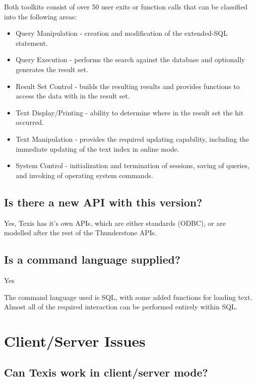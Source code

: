 Both toolkits consist of over 50 user exits or function calls that can be
classified into the following areas:
\begin{itemize}
 \item  Query Manipulation - creation and modification of the
extended-SQL statement.

 \item  Query Execution - performs the search against the database and
optionally generates the result set.

 \item  Result Set Control - builds the resulting results and provides
functions to access the data with in the result set.

 \item  Text Display/Printing - ability to determine where in the result
set the hit occurred.

 \item  Text Manipulation - provides the required updating capability,
including the immediate updating of the text index in online mode.

 \item  System Control - initialization and termination of sessions,
saving of queries, and invoking of operating system commands.
\end{itemize}
\subsection{Is there a new API with this version?}

Yes, Texis has it's own APIs, which are either standards (ODBC), or
are modelled after the rest of the Thunderstone APIs.

\subsection{Is a command language supplied?}

Yes

The command language used is SQL, with some added functions for loading
text.  Almost all of the required interaction can be performed entirely
within SQL.

\section{Client/Server Issues}

\subsection{Can Texis work in client/server mode?}

